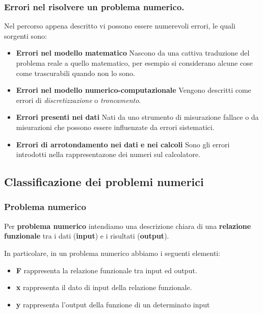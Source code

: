 \subsubsection{Errori nel risolvere un problema numerico.}
Nel percorso appena descritto vi possono essere numerevoli errori, 
%
le quali sorgenti sono:
\begin{itemize}
    \item \textbf{Errori nel modello matematico} Nascono da una cattiva 
%
    traduzione del problema reale a quello matematico, per esempio si 
%
    considerano alcune cose come trascurabili quando non lo sono.
    \item \textbf{Errori nel modello numerico-computazionale} Vengono 
%
    descritti come errori di \textit{discretizzazione} o \textit{troncamento}.
    \item \textbf{Errori presenti nei dati} Nati da uno strumento di
%
    misurazione fallace o da misurazioni che possono essere influenzate
%
    da errori sistematici.
    \item \textbf{Errori di arrotondamento nei dati e nei calcoli} Sono 
%
    gli errori introdotti nella rappresentazone dei numeri sul calcolatore.
\end{itemize}
\newpage
\subsection{Classificazione dei problemi numerici}
\subsubsection{Problema numerico}
\begin{definition} Per \textbf{problema numerico}
%
    intendiamo una descrizione chiara di una \textbf{relazione funzionale}  
%
    tra i dati (\textbf{input}) e i risultati (\textbf{output}).
\end{definition}
In particolare, in un problema numerico abbiamo i seguenti elementi:
\begin{itemize}
    \item \textbf{F} rappresenta la relazione funzionale tra input ed output.
    \item \textbf{x} rappresenta il dato di input della relazione funzionale.
    \item \textbf{y} rappresenta l’output della funzione di un determinato input
\end{itemize}
